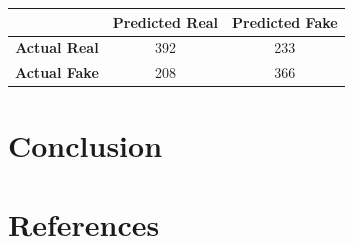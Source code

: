 \documentclass[10pt,twocolumn,letterpaper]{article}
\begin{document}
\begin{table}[h]
    \centering
    \begin{tabular}{|c|c|c|}
        \hline
        & \textbf{Predicted Real} & \textbf{Predicted Fake} \\ \hline
        \textbf{Actual Real} & 392 & 233 \\ \hline
        \textbf{Actual Fake} & 208 & 366 \\ \hline
    \end{tabular}
\end{table}


\section{Conclusion}
\section{References}
\end{document}
